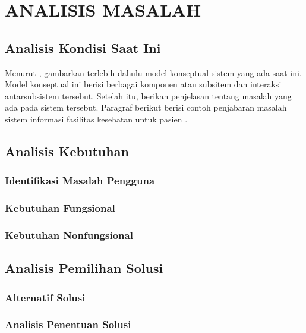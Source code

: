 \documentclass[12pt,a4paper,oneside]{book}
\begin{document}
\chapter{ANALISIS MASALAH}
\section{Analisis Kondisi Saat Ini}
Menurut \textcite{BPPT2020}, gambarkan terlebih dahulu model konseptual sistem yang ada saat ini. Model konseptual ini berisi berbagai komponen atau subsitem dan interaksi antarsubsistem tersebut. Setelah itu, berikan penjelasan tentang masalah yang ada pada sistem tersebut. Paragraf berikut berisi contoh penjabaran masalah sistem informasi fasilitas kesehatan untuk pasien \autocite{Halkiopoulos2024}. 
\section{Analisis Kebutuhan}
\lipsum[4]
\subsection{Identifikasi Masalah Pengguna}
\lipsum[5]
\subsection{Kebutuhan Fungsional}
\lipsum[6]
\subsection{Kebutuhan Nonfungsional}
\lipsum[7]

\section{Analisis Pemilihan Solusi}
\subsection{Alternatif Solusi}
\lipsum[8]
\subsection{Analisis Penentuan Solusi}
\lipsum[9]
\end{document}
